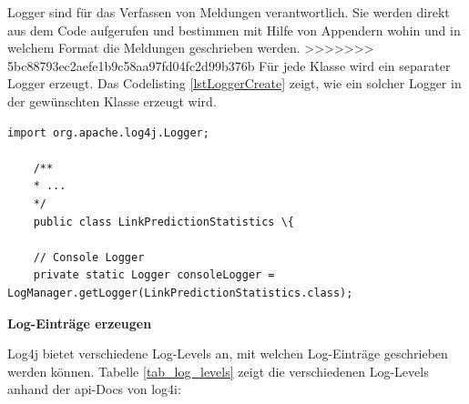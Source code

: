 Logger sind für das Verfassen von Meldungen verantwortlich. Sie werden direkt aus dem Code aufgerufen und bestimmen mit Hilfe von Appendern wohin und in welchem Format die Meldungen geschrieben werden.
>>>>>>> 5bc88793ec2aefe1b9c58aa97fd04fc2d99b376b
Für jede Klasse wird ein separater Logger erzeugt. Das Codelisting \ref{lstLoggerCreate} zeigt, wie ein solcher Logger in der gewünschten Klasse erzeugt wird.

\begin{lstlisting}[caption={Erzeugen eines Loggers},label=lstLoggerCreate]
    import org.apache.log4j.Logger;

    /**
    * ...
    */
    public class LinkPredictionStatistics \{

    // Console Logger
    private static Logger consoleLogger = LogManager.getLogger(LinkPredictionStatistics.class);
\end{lstlisting}

\textbf{Log-Einträge erzeugen}

Log4j bietet verschiedene Log-Levels an, mit welchen Log-Einträge geschrieben werden können.
Tabelle \ref{tab_log_levels} zeigt die verschiedenen Log-Levels anhand der \acs{api}-Docs von log4i:

